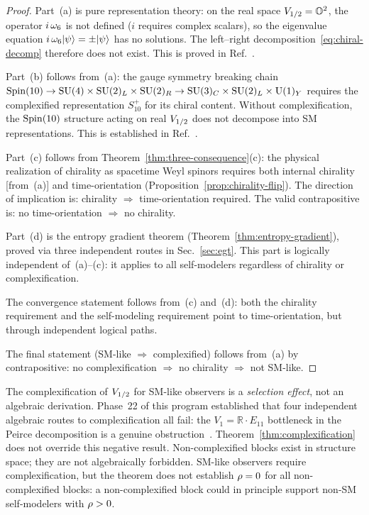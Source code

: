 \begin{proof}
Part~(a) is pure representation theory: on the real space
$V_{1/2} = \mathbb{O}^2$, the operator $i\,\omega_6$ is not
defined ($i$ requires complex scalars), so the eigenvalue equation
$i\,\omega_6| \psi \rangle = \pm| \psi \rangle$ has no solutions.  The
left--right decomposition~\eqref{eq:chiral-decomp} therefore does
not exist.  This is proved in Ref.~\cite{Paper7}.

Part~(b) follows from~(a): the gauge symmetry breaking chain
$\mathrm{Spin}(10) \to \mathrm{SU}(4) \times \mathrm{SU}(2)_L \times \mathrm{SU}(2)_R \to \mathrm{SU}(3)_C \times \mathrm{SU}(2)_L \times \mathrm{U}(1)_Y$ requires the complexified
representation $S_{10}^+$ for its chiral content.  Without
complexification, the $\mathrm{Spin}(10)$ structure acting on real
$V_{1/2}$ does not decompose into SM representations.  This is
established in Ref.~\cite{Paper7}.

Part~(c) follows from
Theorem~\ref{thm:three-consequence}(c): the physical realization
of chirality as spacetime Weyl spinors requires both internal
chirality [from~(a)] and time-orientation
(Proposition~\ref{prop:chirality-flip}).  The direction of
implication is: chirality $\Rightarrow$ time-orientation required.
The valid contrapositive is: no time-orientation $\Rightarrow$ no
chirality.

Part~(d) is the entropy gradient theorem
(Theorem~\ref{thm:entropy-gradient}), proved via three independent
routes in Sec.~\ref{sec:egt}.  This part is logically independent
of~(a)--(c): it applies to all self-modelers regardless of
chirality or complexification.

The convergence statement follows from~(c) and~(d): both the
chirality requirement and the self-modeling requirement point to
time-orientation, but through independent logical paths.

The final statement (SM-like $\Rightarrow$ complexified) follows
from~(a) by contrapositive: no complexification $\Rightarrow$ no
chirality $\Rightarrow$ not SM-like.
\end{proof}

\begin{remark}
\label{rem:selection-not-forcing}
The complexification of $V_{1/2}$ for SM-like observers is a
\emph{selection effect}, not an algebraic derivation.  Phase~22 of
this program established that four independent algebraic routes to
complexification all fail: the
$V_1 = \mathbb{R}\cdot E_{11}$ bottleneck in the Peirce
decomposition is a genuine obstruction~\cite{BGW2020}.
Theorem~\ref{thm:complexification} does not override this negative
result.  Non-complexified blocks exist in structure space; they are
not algebraically forbidden.  SM-like observers require
complexification, but the theorem does not establish
$\rho = 0$ for all non-complexified blocks: a non-complexified
block could in principle support non-SM self-modelers with
$\rho > 0$.
\end{remark}

